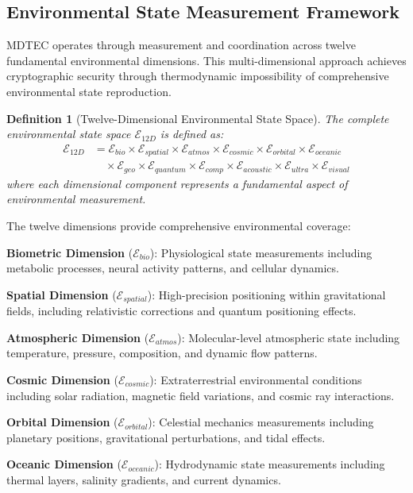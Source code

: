 \documentclass[12pt,a4paper]{article}
\newtheorem{definition}[theorem]{Definition}
\begin{document}
\subsection{Environmental State Measurement Framework}

MDTEC operates through measurement and coordination across twelve fundamental environmental dimensions. This multi-dimensional approach achieves cryptographic security through thermodynamic impossibility of comprehensive environmental state reproduction.

\begin{definition}[Twelve-Dimensional Environmental State Space]
The complete environmental state space $\mathcal{E}_{12D}$ is defined as:
\begin{align}
\mathcal{E}_{12D} &= \mathcal{E}_{bio} \times \mathcal{E}_{spatial} \times \mathcal{E}_{atmos} \times \mathcal{E}_{cosmic} \times \mathcal{E}_{orbital} \times \mathcal{E}_{oceanic} \\
&\quad \times \mathcal{E}_{geo} \times \mathcal{E}_{quantum} \times \mathcal{E}_{comp} \times \mathcal{E}_{acoustic} \times \mathcal{E}_{ultra} \times \mathcal{E}_{visual}
\end{align}
where each dimensional component represents a fundamental aspect of environmental measurement.
\end{definition}

The twelve dimensions provide comprehensive environmental coverage:

\textbf{Biometric Dimension} ($\mathcal{E}_{bio}$): Physiological state measurements including metabolic processes, neural activity patterns, and cellular dynamics.

\textbf{Spatial Dimension} ($\mathcal{E}_{spatial}$): High-precision positioning within gravitational fields, including relativistic corrections and quantum positioning effects.

\textbf{Atmospheric Dimension} ($\mathcal{E}_{atmos}$): Molecular-level atmospheric state including temperature, pressure, composition, and dynamic flow patterns.

\textbf{Cosmic Dimension} ($\mathcal{E}_{cosmic}$): Extraterrestrial environmental conditions including solar radiation, magnetic field variations, and cosmic ray interactions.

\textbf{Orbital Dimension} ($\mathcal{E}_{orbital}$): Celestial mechanics measurements including planetary positions, gravitational perturbations, and tidal effects.

\textbf{Oceanic Dimension} ($\mathcal{E}_{oceanic}$): Hydrodynamic state measurements including thermal layers, salinity gradients, and current dynamics.
\end{document}
